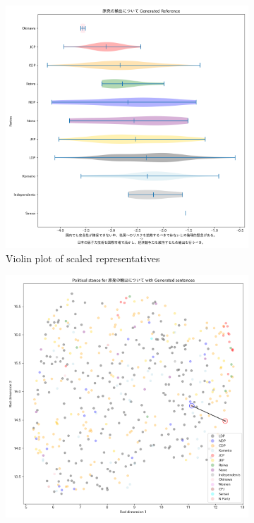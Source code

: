\documentclass[final,5p,times,twocolumn,authoryear]{elsarticle}
\begin{document}
\begin{figure}[h]
\centering
    \begin{subfigure}{0.22\textwidth}
      \centering
      \includegraphics[width=1\linewidth]{figs/results/nuclear/exporting_gen_violin_plot.png}
      \caption{Violin plot of scaled representatives}
    \end{subfigure}
    \begin{subfigure}{0.22\textwidth}
      \centering
      \includegraphics[width=1\linewidth]{figs/results/nuclear/exportingnew_umap_gen.png}

\end{subfigure}
\end{figure}
\end{document}
